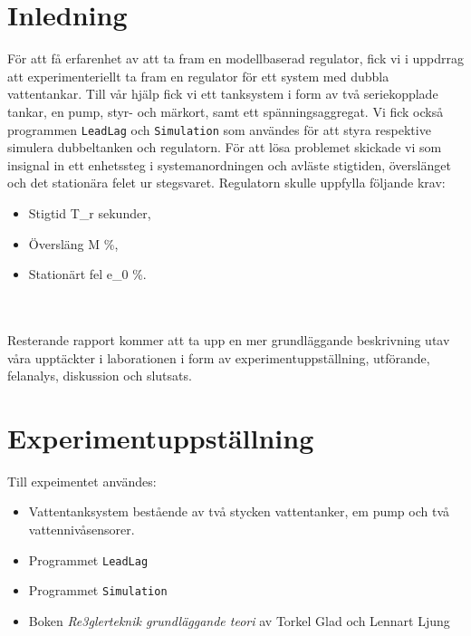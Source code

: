 \documentclass[10pt, titlepage, oneside, a4paper]{article}
\newcommand{\Section}[1]{\section{#1}\vspace{-8pt}}
\begin{document}
	\newpage


	\setlength{\parindent}{0pt}
	\setlength{\parskip}{10pt}

	\Section{Inledning}
			För att få erfarenhet av att ta fram en modellbaserad regulator, fick vi i uppdrrag att experimenteriellt ta fram en regulator för ett system med dubbla vattentankar. Till vår hjälp fick vi ett tanksystem i form av två seriekopplade tankar, en pump, styr- och märkort, samt ett spänningsaggregat. Vi fick också programmen \texttt{LeadLag} och \texttt{Simulation} som användes för att styra respektive simulera dubbeltanken och regulatorn. För att lösa problemet skickade vi som insignal in ett enhetssteg i systemanordningen och avläste stigtiden, överslänget och det stationära felet ur stegsvaret. Regulatorn skulle uppfylla följande krav:
	\begin{itemize}
		\item Stigtid T_{r}  sekunder,
		\item Översläng M  \%,	
		\item Stationärt fel e_{0}  \%. 
	\end{itemize}
\\\\Resterande rapport kommer att ta upp en mer grundläggande beskrivning utav våra upptäckter i laborationen i form av experimentuppställning, utförande, felanalys, diskussion och slutsats.
		\section{Experimentuppställning}
			Till expeimentet användes:
			\begin{itemize}
			\item Vattentanksystem bestående av två stycken vattentanker, em pump och två vattennivåsensorer.		
			\item Programmet \texttt{LeadLag}
			\item Programmet \texttt{Simulation}
			\item Boken \textsl{Re3glerteknik grundläggande teori} av Torkel Glad och Lennart Ljung
			\end{itemize}
		
\end{document}
